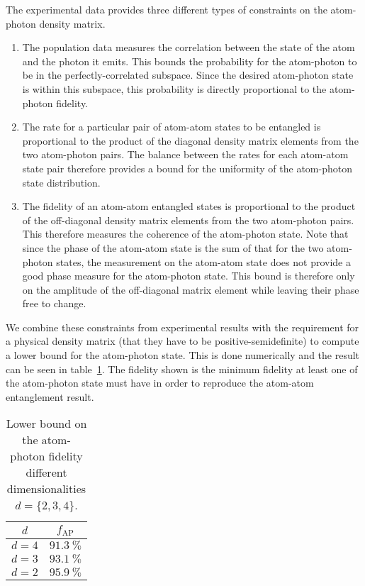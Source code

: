 \documentclass[10pt,fleqn]{article}
\begin{document}
The experimental data provides three different types of constraints
on the atom-photon density matrix.
\begin{enumerate}
\item The population data measures the correlation between the state
  of the atom and the photon it emits.
  This bounds the probability for the atom-photon to be in the perfectly-correlated
  subspace. Since the desired atom-photon state is within this subspace,
  this probability is directly proportional to the atom-photon fidelity.
\item The rate for a particular pair of atom-atom states to be entangled
  is proportional to the product of the diagonal density matrix elements
  from the two atom-photon pairs.
  The balance between the rates for each atom-atom state pair
  therefore provides a bound for the uniformity of the atom-photon state distribution.
\item The fidelity of an atom-atom entangled states is proportional to
  the product of the off-diagonal density matrix elements
  from the two atom-photon pairs.
  This therefore measures the coherence of the atom-photon state.
  Note that since the phase of the atom-atom state is the sum of
  that for the two atom-photon states, the measurement on the atom-atom state
  does not provide a good phase measure for the atom-photon state.
  This bound is therefore only on the amplitude of the off-diagonal matrix element
  while leaving their phase free to change.
\end{enumerate}
We combine these constraints from experimental results
with the requirement for a physical density matrix
(that they have to be positive-semidefinite) to compute a lower bound for
the atom-photon state. This is done numerically and the result can be seen
in table~\ref{tab:M:atom-photon-result}.
The fidelity shown is the minimum fidelity at least one of the atom-photon state
must have in order to reproduce the atom-atom entanglement result.

\begin{table}[h!]
  \centering
  \begin{tabular}{|c|c|}
    \hline
    $d$ & $f_{\mathrm{AP}}$ \\\hline
    \textbf{$d=4$} & $91.3\ \%$ \\ \hline
    \textbf{$d=3$} & $93.1\ \%$ \\ \hline
    \textbf{$d=2$} & $95.9\ \%$ \\ \hline
  \end{tabular}
  \caption{
    Lower bound on the atom-photon fidelity different dimensionalities $d=\{2,3,4\}$.
  }
  \label{tab:M:atom-photon-result}
\end{table}
\end{document}

